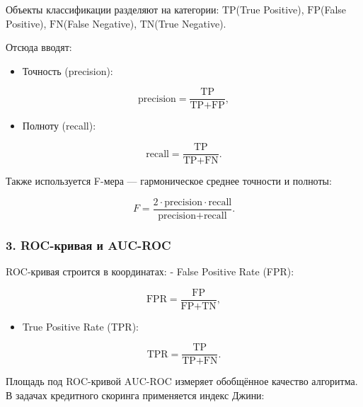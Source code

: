 Объекты классификации разделяют на категории: \(\text{TP}\)(True
Positive), \(\text{FP}\)(False Positive), \(\text{FN}\)(False Negative),
\(\text{TN}\)(True Negative).

Отсюда вводят: 
\begin{itemize}
\tightlist
\item
Точность (precision):
\end{itemize}

\begin{equation}
\text{precision} = \frac{\text{TP}}{\text{TP} + \text{FP}},
\end{equation}

\begin{itemize}
\tightlist
\item
  Полноту (recall):
\end{itemize}

\begin{equation}
\text{recall} = \frac{\text{TP}}{\text{TP} + \text{FN}}.
\end{equation}

Также используется F-мера --- гармоническое среднее точности и
полноты:

\begin{equation}
F = \frac{2 \cdot \text{precision} \cdot \text{recall}}{\text{precision} + \text{recall}}.
\end{equation}

\hypertarget{roc-ux43aux440ux438ux432ux430ux44f-ux438-auc-roc}{%
\subsubsection*{3. ROC-кривая и
AUC-ROC}\label{roc-ux43aux440ux438ux432ux430ux44f-ux438-auc-roc}}

ROC-кривая строится в координатах: - False Positive Rate (FPR):

\begin{equation}
\text{FPR} = \frac{\text{FP}}{\text{FP} + \text{TN}},
\end{equation}

\begin{itemize}
\tightlist
\item
  True Positive Rate (TPR):
\end{itemize}

\begin{equation}
\text{TPR} = \frac{\text{TP}}{\text{TP} + \text{FN}}.
\end{equation}

Площадь под ROC-кривой \( \text{AUC-ROC} \) измеряет обобщённое
качество алгоритма. В задачах кредитного скоринга применяется
индекс Джини:

